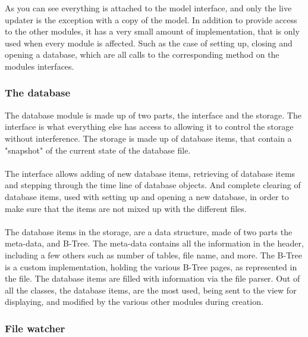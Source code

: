As you can see everything is attached to the model interface, and only the live updater is the exception with a copy of the model. In addition to provide access to the other modules, it has a very small amount of implementation, that is only used when every module is affected. Such as the case of setting up, closing and opening a database, which are all calls to the corresponding method on the modules interfaces. 

\subsubsection{The database}
\label{subsubsec:databse_imp}

The database module is made up of two parts, the interface and the storage. The interface is what everything else has access to allowing it to control the storage without interference. The storage is made up of database items, that contain a "snapshot" of the current state of the database file.
\\\\
The interface allows adding of new database items, retrieving of database items and stepping through the time line of database objects. And complete clearing of database items, used with setting up and opening a new database, in order to make sure that the items are not mixed up with the different files.
\\\\
The database items in the storage, are a data structure, made of two parts the meta-data, and B-Tree. The meta-data contains all the information in the header, including a few others such as number of tables, file name, and more. The B-Tree is a custom implementation, holding the various B-Tree pages, as represented in the file. The database items are filled with information via the file parser. Out of all the classes, the database items, are the most used, being sent to the view for displaying, and modified by the various other modules during creation. 

\subsubsection{File watcher}
\label{subsubsec:file_watcher_imp}

